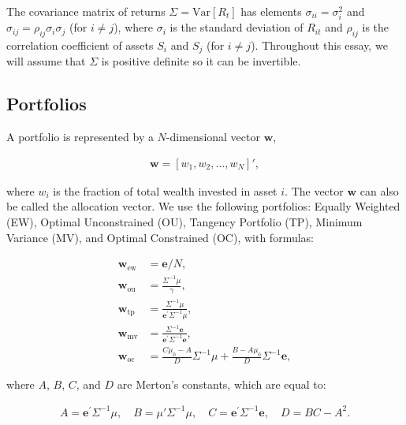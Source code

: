 \documentclass[12pt,oneside,a4paper]{memoir}
\begin{document}
\noindent
The covariance matrix of returns $\Sigma = \mathrm{Var}[R_{t}]$ has elements
$\sigma_{ii} = \sigma_i^2$ and $\sigma_{ij} = \rho_{ij} \sigma_i \sigma_j$ (for $i \neq j$), where  $\sigma_i$ is the standard deviation of $R_{it}$ and $\rho_{ij}$ is the correlation coefficient of assets $S_i$ and $S_j$ (for $i \neq j$).
Throughout this essay, we will assume that $\Sigma$ is positive definite so it can be invertible.

\subsection*{Portfolios}
A portfolio is represented by a $N$-dimensional vector $\mathbf{w}$,

\vspace{-18 pt}
\begin{align*}
	\mathbf{w} = \left[ w_1, w_2 , \dots, w_N \right]',
\end{align*}

\noindent
where $w_{i}$ is the fraction of total wealth invested in asset $i$.
The vector $\mathbf{w}$ can also be called the allocation vector.
We use the following portfolios: Equally Weighted (EW), Optimal Unconstrained (OU), Tangency Portfolio (TP), Minimum Variance (MV), and Optimal Constrained (OC), with formulas:

\vspace{-18 pt}
\begin{align}
\label{wew}
\mathbf{w}_{\textrm{ew}} &= \mathbf{e}/N,
\\
\label{wou}
\mathbf{w}_{\mathrm{ou}} & =\frac{ \Sigma^{-1} \mu }{ \gamma},
\\
\label{wtp}
\mathbf{w}_{\mathrm{tp}} &= \frac{\Sigma^{-1} \mu}{\mathbf{e}^{\prime} \Sigma^{-1} \mu},
\\
\label{wmv}
\mathbf{w}_{\mathrm{mv}} &= \frac{\Sigma^{-1}\mathbf{e}}{\mathbf{e}^{\prime}\Sigma^{-1}\mathbf{e}},
\\
\label{woc}
\mathbf{w}_{\mathrm{oc}} &= \frac{C \mu_0 - A }{D}\Sigma^{-1} \mu +
\frac{B - A \mu_0}{D}\Sigma^{-1} \mathbf{e},
\end{align}

\noindent 
where $A$, $B$, $C$, and $D$ are Merton's constants, which are equal to:

\vspace{-18 pt}
\begin{align}\label{merton:cte}
	A = \mathbf{e}^{\prime}\Sigma^{-1}\mu, \quad
	B = \mu'\Sigma^{-1}\mu,\quad
	C = \mathbf{e}^{\prime}\Sigma^{-1}\mathbf{e}, \quad
	D = BC - A^2.
\end{align}
\end{document}
